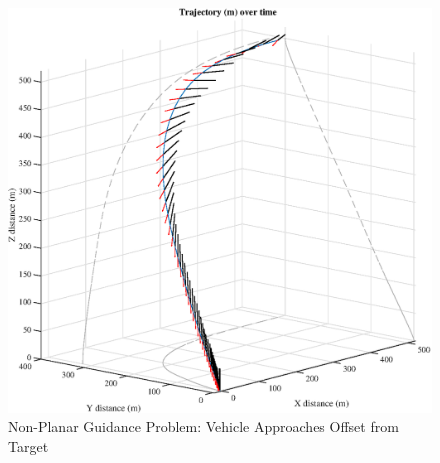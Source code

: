 \documentclass[conf]{new-aiaa}
\begin{document}
\clearpage
\begin{figure}[!htbp] 
  \centering
  \includegraphics[width=\textwidth]{figs/nonplanar_3dtraj.eps}
  \caption{Non-Planar Guidance Problem: Vehicle Approaches Offset from Target}
  \label{fig:nplanar}
 \end{figure}
\end{document}
